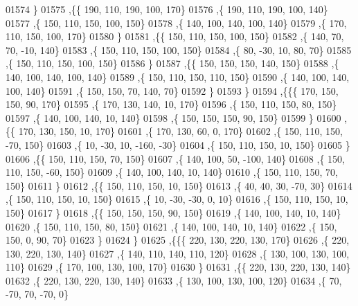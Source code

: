 \begin{DoxyCode}
01574     \}
01575    ,\{\{   190,   110,   190,   100,   170\}
01576     ,\{   190,   110,   190,   100,   140\}
01577     ,\{   150,   110,   150,   100,   150\}
01578     ,\{   140,   100,   140,   100,   140\}
01579     ,\{   170,   110,   150,   100,   170\}
01580     \}
01581    ,\{\{   150,   110,   150,   100,   150\}
01582     ,\{   140,    70,    70,   -10,   140\}
01583     ,\{   150,   110,   150,   100,   150\}
01584     ,\{    80,   -30,    10,    80,    70\}
01585     ,\{   150,   110,   150,   100,   150\}
01586     \}
01587    ,\{\{   150,   150,   150,   140,   150\}
01588     ,\{   140,   100,   140,   100,   140\}
01589     ,\{   150,   110,   150,   110,   150\}
01590     ,\{   140,   100,   140,   100,   140\}
01591     ,\{   150,   150,    70,   140,    70\}
01592     \}
01593    \}
01594   ,\{\{\{   170,   150,   150,    90,   170\}
01595     ,\{   170,   130,   140,    10,   170\}
01596     ,\{   150,   110,   150,    80,   150\}
01597     ,\{   140,   100,   140,    10,   140\}
01598     ,\{   150,   150,   150,    90,   150\}
01599     \}
01600    ,\{\{   170,   130,   150,    10,   170\}
01601     ,\{   170,   130,    60,     0,   170\}
01602     ,\{   150,   110,   150,   -70,   150\}
01603     ,\{    10,   -30,    10,  -160,   -30\}
01604     ,\{   150,   110,   150,    10,   150\}
01605     \}
01606    ,\{\{   150,   110,   150,    70,   150\}
01607     ,\{   140,   100,    50,  -100,   140\}
01608     ,\{   150,   110,   150,   -60,   150\}
01609     ,\{   140,   100,   140,    10,   140\}
01610     ,\{   150,   110,   150,    70,   150\}
01611     \}
01612    ,\{\{   150,   110,   150,    10,   150\}
01613     ,\{    40,    40,    30,   -70,    30\}
01614     ,\{   150,   110,   150,    10,   150\}
01615     ,\{    10,   -30,   -30,     0,    10\}
01616     ,\{   150,   110,   150,    10,   150\}
01617     \}
01618    ,\{\{   150,   150,   150,    90,   150\}
01619     ,\{   140,   100,   140,    10,   140\}
01620     ,\{   150,   110,   150,    80,   150\}
01621     ,\{   140,   100,   140,    10,   140\}
01622     ,\{   150,   150,     0,    90,    70\}
01623     \}
01624    \}
01625   ,\{\{\{   220,   130,   220,   130,   170\}
01626     ,\{   220,   130,   220,   130,   140\}
01627     ,\{   140,   110,   140,   110,   120\}
01628     ,\{   130,   100,   130,   100,   110\}
01629     ,\{   170,   100,   130,   100,   170\}
01630     \}
01631    ,\{\{   220,   130,   220,   130,   140\}
01632     ,\{   220,   130,   220,   130,   140\}
01633     ,\{   130,   100,   130,   100,   120\}
01634     ,\{    70,   -70,    70,   -70,     0\}

\end{DoxyCode}
